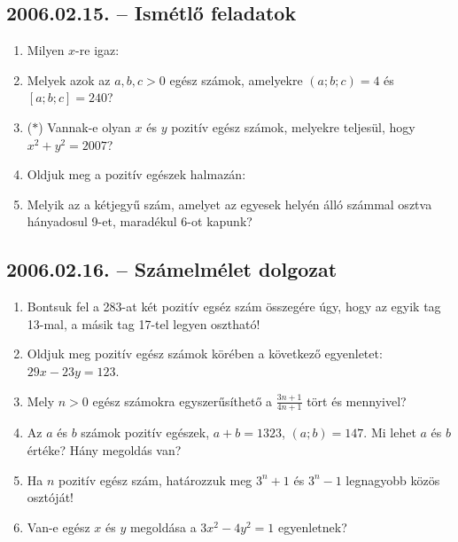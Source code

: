 \subsection*{2006.02.15. -- Ismétlő feladatok}
\begin{enumerate}
 
\item Milyen $x$-re igaz:


\item Melyek azok az $a,b,c>0$ egész számok, amelyekre $(a;b;c)=4$ és $[a;b;c]=240$?


\item ($*$) Vannak-e olyan $x$ és $y$ pozitív egész számok, melyekre teljesül, hogy $x^2+y^2=2007$?

\item Oldjuk meg a pozitív egészek halmazán:


\item Melyik az a kétjegyű szám, amelyet az egyesek helyén álló számmal osztva hányadosul 9-et, maradékul 6-ot kapunk?
\end{enumerate}

\subsection*{2006.02.16. -- Számelmélet dolgozat}
\begin{enumerate}
\item Bontsuk fel a 283-at két pozitív egséz szám összegére úgy, hogy az egyik tag 13-mal, a másik tag 17-tel legyen osztható!

\item Oldjuk meg  pozitív egész számok körében a következő egyenletet: $29x-23y=123$.

\item Mely $n>0$ egész számokra egyszerűsíthető a $\frac{3n+1}{4n+1}$ tört és mennyivel?

\item Az $a$ és $b$ számok pozitív egészek, $a+b=1323$, $(a;b)=147$. Mi lehet $a$ és $b$ értéke? Hány megoldás van?

\item Ha $n$ pozitív egész szám, határozzuk meg $3^n+1$ és $3^n-1$ legnagyobb közös osztóját!

\item Van-e egész $x$ és $y$ megoldása a $3x^2-4y^2=1$ egyenletnek?

\end{enumerate}

